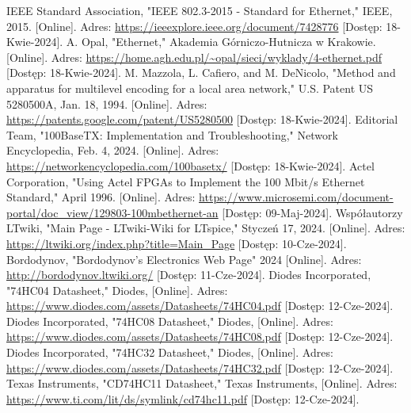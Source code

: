 \documentclass{article}
\begin{document}
\begin{thebibliography}{99}

 IEEE Standard Association, "IEEE 802.3-2015 - Standard for Ethernet," IEEE, 2015. [Online]. Adres: \url{https://ieeexplore.ieee.org/document/7428776} [Dostęp: 18-Kwie-2024].
 A. Opal, "Ethernet," Akademia Górniczo-Hutnicza w Krakowie. [Online]. Adres: \url{https://home.agh.edu.pl/~opal/sieci/wyklady/4-ethernet.pdf} [Dostęp: 18-Kwie-2024].
 M. Mazzola, L. Cafiero, and M. DeNicolo, "Method and apparatus for multilevel encoding for a local area network," U.S. Patent US 5280500A, Jan. 18, 1994. [Online]. Adres: \url{https://patents.google.com/patent/US5280500} [Dostęp: 18-Kwie-2024].
 Editorial Team, "100BaseTX: Implementation and Troubleshooting," Network Encyclopedia, Feb. 4, 2024. [Online]. Adres: \url{https://networkencyclopedia.com/100basetx/} [Dostęp: 18-Kwie-2024].
 Actel Corporation, "Using Actel FPGAs to Implement the 100 Mbit/s Ethernet Standard," April 1996. [Online]. Adres: \url{https://www.microsemi.com/document-portal/doc_view/129803-100mbethernet-an} [Dostęp: 09-Maj-2024].
 Współautorzy LTwiki, "Main Page - LTwiki-Wiki for LTspice," Styczeń 17, 2024. [Online]. Adres: \url{https://ltwiki.org/index.php?title=Main_Page} [Dostęp: 10-Cze-2024].
 Bordodynov, "Bordodynov's Electronics Web Page" 2024 [Online]. Adres: \url{http://bordodynov.ltwiki.org/} [Dostęp: 11-Cze-2024].
 Diodes Incorporated, "74HC04 Datasheet," Diodes, [Online]. Adres: \url{https://www.diodes.com/assets/Datasheets/74HC04.pdf} [Dostęp: 12-Cze-2024].
 Diodes Incorporated, "74HC08 Datasheet," Diodes, [Online]. Adres: \url{https://www.diodes.com/assets/Datasheets/74HC08.pdf} [Dostęp: 12-Cze-2024].
 Diodes Incorporated, "74HC32 Datasheet," Diodes, [Online]. Adres: \url{https://www.diodes.com/assets/Datasheets/74HC32.pdf} [Dostęp: 12-Cze-2024].
 Texas Instruments, "CD74HC11 Datasheet," Texas Instruments, [Online]. Adres: \url{https://www.ti.com/lit/ds/symlink/cd74hc11.pdf} [Dostęp: 12-Cze-2024].

\end{thebibliography}

\newpage
\listoffigures
\listoftables
\end{document}

